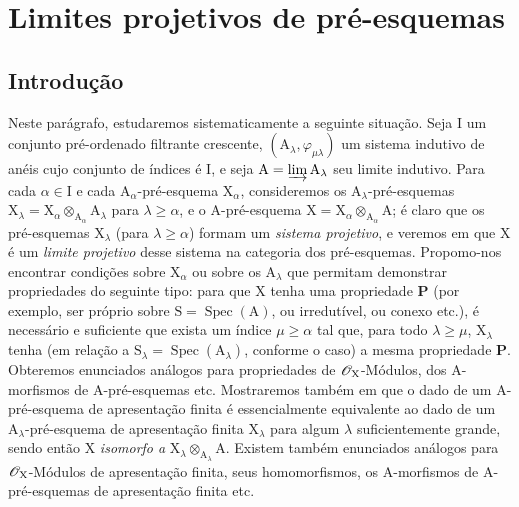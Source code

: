 \section{Limites projetivos de pré-esquemas}
\label{section:IV.8}

\subsection{Introdução}
\label{subsection:IV.8.1}


\begin{env}[8.1.1]
\label{IV.8.1.1}
Neste parágrafo, estudaremos sistematicamente a seguinte situação.
Seja $\mathrm{I}$ um conjunto pré-ordenado filtrante crescente, $(\mathrm{A}_\lambda,\varphi_{\mu\lambda})$ um sistema indutivo de anéis cujo conjunto de índices é $\mathrm{I}$, e seja $\mathrm{A}=\varinjlim\mathrm{A}_\lambda$ seu limite indutivo.
Para cada $\alpha\in\mathrm{I}$ e cada $\mathrm{A}_\alpha$-pré-esquema $\mathrm{X}_\alpha$, consideremos os $\mathrm{A}_\lambda$-pré-esquemas $\mathrm{X}_\lambda=\mathrm{X}_\alpha\otimes_{\mathrm{A}_\alpha}\mathrm{A}_\lambda$ para $\lambda\geqslant\alpha$, e o $\mathrm{A}$-pré-esquema $\mathrm{X}=\mathrm{X}_\alpha\otimes_{\mathrm{A}_\alpha}\mathrm{A}$; é claro que os pré-esquemas $\mathrm{X}_\lambda$ (para $\lambda\geqslant\alpha$) formam um \emph{sistema projetivo}, e veremos em  que $\mathrm{X}$ é um \emph{limite projetivo} desse sistema na categoria dos pré-esquemas.
Propomo-nos encontrar condições sobre $\mathrm{X}_\alpha$ ou sobre os $\mathrm{A}_\lambda$ que permitam demonstrar propriedades do seguinte tipo:
para que $\mathrm{X}$ tenha uma propriedade $\mathbf{P}$ (por exemplo, ser próprio sobre $\mathrm{S}=\operatorname{Spec}(\mathrm{A})$, ou irredutível, ou conexo etc.), é necessário e suficiente que exista um índice $\mu\geqslant\alpha$ tal que, para todo $\lambda\geqslant\mu$, $\mathrm{X}_\lambda$ tenha (em relação a $\mathrm{S}_\lambda=\operatorname{Spec}(\mathrm{A}_\lambda)$, conforme o caso) a mesma propriedade $\mathbf{P}$.
Obteremos enunciados análogos para propriedades de $\mathscr{O}_\mathrm{X}$-Módulos, dos $\mathrm{A}$-morfismos de $\mathrm{A}$-pré-esquemas etc.
Mostraremos também em  que o dado de um $\mathrm{A}$-pré-esquema de apresentação finita  é essencialmente equivalente ao dado de um $\mathrm{A}_\lambda$-pré-esquema de apresentação finita $\mathrm{X}_\lambda$ para algum $\lambda$ suficientemente grande, sendo então $\mathrm{X}$ \emph{isomorfo a} $\mathrm{X}_\lambda\otimes_{\mathrm{A}_\lambda}\mathrm{A}$.
Existem também enunciados análogos para $\mathscr{O}_\mathrm{X}$-Módulos de apresentação finita, seus homomorfismos, os $\mathrm{A}$-morfismos de $\mathrm{A}$-pré-esquemas de apresentação finita etc.
\end{env}

